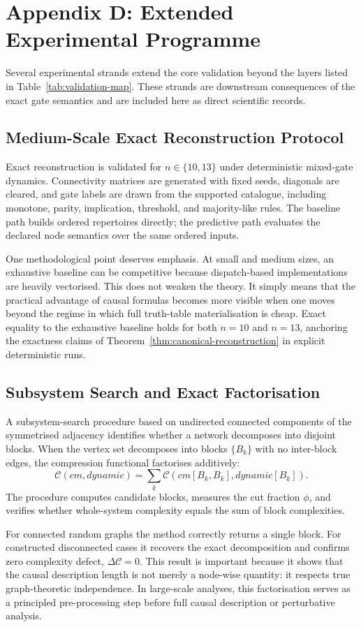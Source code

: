 \documentclass[11pt]{article}
\theoremstyle{definition}
\begin{document}
\section{Appendix D: Extended Experimental Programme}
Several experimental strands extend the core validation beyond the layers listed in Table~\ref{tab:validation-map}. These strands are downstream consequences of the exact gate semantics and are included here as direct scientific records.

\subsection{Medium-Scale Exact Reconstruction Protocol}
Exact reconstruction is validated for \(n\in\{10,13\}\) under deterministic mixed-gate dynamics. Connectivity matrices are generated with fixed seeds, diagonals are cleared, and gate labels are drawn from the supported catalogue, including monotone, parity, implication, threshold, and majority-like rules. The baseline path builds ordered repertoires directly; the predictive path evaluates the declared node semantics over the same ordered inputs.

One methodological point deserves emphasis. At small and medium sizes, an exhaustive baseline can be competitive because dispatch-based implementations are heavily vectorised. This does not weaken the theory. It simply means that the practical advantage of causal formulas becomes more visible when one moves beyond the regime in which full truth-table materialisation is cheap. Exact equality to the exhaustive baseline holds for both \(n=10\) and \(n=13\), anchoring the exactness claims of Theorem~\ref{thm:canonical-reconstruction} in explicit deterministic runs.

\subsection{Subsystem Search and Exact Factorisation}
A subsystem-search procedure based on undirected connected components of the symmetrised adjacency identifies whether a network decomposes into disjoint blocks. When the vertex set decomposes into blocks \(\{B_k\}\) with no inter-block edges, the compression functional factorises additively:
\[
\mathcal{C}(cm,dynamic)=\sum_k \mathcal{C}(cm[B_k,B_k],dynamic[B_k]).
\]
The procedure computes candidate blocks, measures the cut fraction \(\phi\), and verifies whether whole-system complexity equals the sum of block complexities.

For connected random graphs the method correctly returns a single block. For constructed disconnected cases it recovers the exact decomposition and confirms zero complexity defect, \(\Delta\mathcal{C}=0\). This result is important because it shows that the causal description length is not merely a node-wise quantity: it respects true graph-theoretic independence. In large-scale analyses, this factorisation serves as a principled pre-processing step before full causal description or perturbative analysis.
\end{document}
